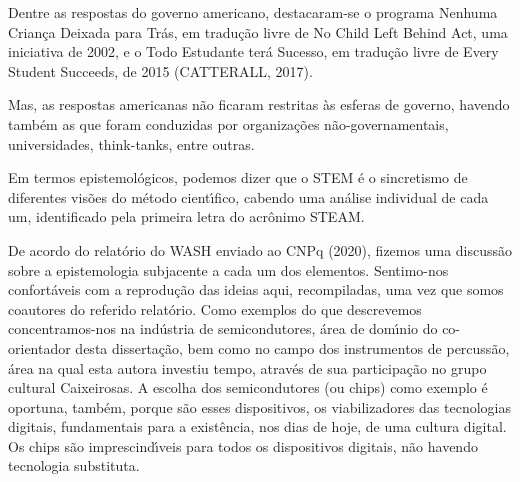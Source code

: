 \documentclass[
12pt,		%
openright,	%
twoside,  %
a4paper,			%
chapter=TITLE,		%
english,			%
french,				%
spanish,			%
brazil				%
]{USPSC-classe/USPSC}
\begin{document}
Dentre as respostas do governo americano, destacaram-se o programa \textquotedbl Nenhuma Crian\c{c}a Deixada para Tr\'as\textquotedbl , em tradu\c{c}\~ao livre de \textquotedbl No Child Left Behind Act\textquotedbl , uma iniciativa de 2002, e o \textquotedbl Todo Estudante ter\'a Sucesso\textquotedbl , em tradu\c{c}\~ao livre de \textquotedbl Every Student Succeeds, de 2015  (CATTERALL, 2017).

















Mas, as respostas americanas n\~ao ficaram restritas \`as esferas de governo, havendo tamb\'em as que foram conduzidas por organiza\c{c}\~oes n\~ao-governamentais, universidades, think-tanks, entre outras.

















Em termos epistemol\'ogicos, podemos dizer que o STEM \'e o sincretismo de diferentes vis\~oes do m\'etodo cient\'{\i}fico, cabendo uma an\'alise individual de cada um, identificado pela primeira letra do acr\^onimo STEAM.

















De acordo do relat\'orio do WASH enviado ao CNPq (2020), fizemos uma discuss\~ao sobre a epistemologia subjacente a cada um dos elementos. Sentimo-nos confort\'aveis com a reprodu\c{c}\~ao das ideias aqui, recompiladas, uma vez que somos coautores do referido relat\'orio. Como exemplos do que descrevemos concentramos-nos na ind\'ustria de semicondutores, \'area de dom\'{\i}nio do co-orientador desta disserta\c{c}\~ao, bem como no campo dos instrumentos de percuss\~ao, \'area na qual esta autora investiu tempo, atrav\'es de sua participa\c{c}\~ao no grupo cultural \textquotedbl Caixeirosas\textquotedbl . A escolha dos semicondutores (ou chips) como exemplo \'e oportuna, tamb\'em, porque s\~ao esses dispositivos, os viabilizadores das tecnologias digitais, fundamentais para a exist\^encia, nos dias de hoje, de uma \textquotedbl cultura digital\textquotedbl . Os chips s\~ao imprescind\'{\i}veis para todos os dispositivos digitais, n\~ao havendo tecnologia substituta.
\end{document}
